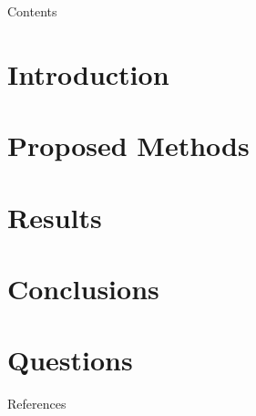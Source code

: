 \documentclass[aspectratio=169]{beamer}
\begin{document}


\begin{frame}{Contents}
  \tableofcontents
\end{frame}

%
%

\section{Introduction}
\label{sec:introduction}


\section{Proposed Methods}
\label{sec:methods}


\section{Results}
\label{sec:results}


\section{Conclusions}
\label{sec:conclusions}


%
%
\section*{Questions}
\begin{frame}{}
  \centering\scalebox{5}{The End}
\end{frame}

\begin{frame}{References}
  
  
\end{frame}
\end{document}
